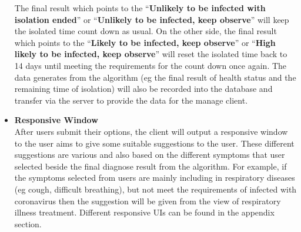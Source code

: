 \documentclass[12pt]{article}
\begin{document}
\begin{itemize}
\begin{itemize}
\end{itemize}
The final result which points to the ``\textbf{Unlikely to be infected with isolation ended}'' or ``\textbf{Unlikely to be infected, keep observe}'' will keep the isolated time count down as usual. On the other side, the final result which points to the ``\textbf{Likely to be infected, keep observe}'' or ``\textbf{High likely to be infected, keep observe}'' will reset the isolated time back to 14 days until meeting the requirements for the count down once again. The data generates from the algorithm (eg the final result of health status and the remaining time of isolation) will also be recorded into the database and transfer via the server to provide the data for the manage client.
\item\textbf{Responsive Window}
\\After users submit their options,  the client will output a responsive window to the user aims to give some suitable suggestions to the user. These different suggestions are various and also based on the different symptoms that user selected beside the final diagnose result from the algorithm. For example, if the symptoms selected from users are mainly including in respiratory diseases (eg cough, difficult breathing), but not meet the requirements of infected with coronavirus then the suggestion will be given from the view of respiratory illness treatment. Different responsive UIs can be found in the appendix section.
\end{itemize}
\end{document}
